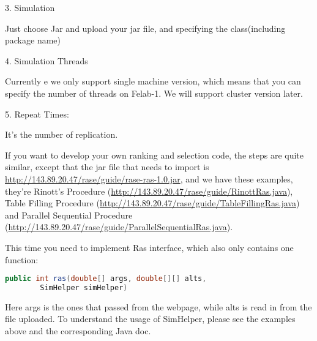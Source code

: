 3.	Simulation

Just choose Jar and upload your jar file, and specifying the class(including package name)

4.	Simulation Threads

Currently e we only support single machine version, which means that you can specify the number of threads on Felab-1. We will support cluster version later.

5.	Repeat Times:

It’s the number of replication.

If you want to develop your own ranking and selection code, the steps are quite similar, except that the jar file that needs to import is \url{http://143.89.20.47/rase/guide/rase-ras-1.0.jar}, and we have these examples, they’re Rinott’s Procedure (\url{http://143.89.20.47/rase/guide/RinottRas.java}), Table Filling Procedure (\url{http://143.89.20.47/rase/guide/TableFillingRas.java}) and Parallel Sequential Procedure (\url{http://143.89.20.47/rase/guide/ParallelSequentialRas.java}).

This time you need to implement Ras interface, which also only contains one function:

\begin{lstlisting}[language=Java]
public int ras(double[] args, double[][] alts,
        SimHelper simHelper)
\end{lstlisting}

Here args is the ones that passed from the webpage, while alts is read in from the file uploaded. To understand the usage of SimHelper, please see the examples above and the corresponding Java doc.
